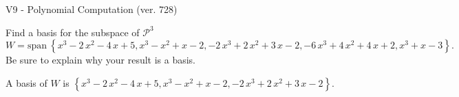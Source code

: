 \begin{exercise}
  \begin{exerciseTitle}V9 - Polynomial Computation (ver. 728)\end{exerciseTitle}
  \begin{exerciseStatement}
    Find a basis for the subspace of \(\mathcal{P}^3\) 
\[W=\mathrm{span}\ \left\{x^{3} - 2 \, x^{2} - 4 \, x + 5 , x^{3} - x^{2} + x - 2 , -2 \, x^{3} + 2 \, x^{2} + 3 \, x - 2 , -6 \, x^{3} + 4 \, x^{2} + 4 \, x + 2 , x^{3} + x - 3\right\}.\]
 Be sure to explain why your result is a basis.


  \end{exerciseStatement}
  \begin{exerciseAnswer}
   A basis of \(W\) is  \(\left\{x^{3} - 2 \, x^{2} - 4 \, x + 5 , x^{3} - x^{2} + x - 2 , -2 \, x^{3} + 2 \, x^{2} + 3 \, x - 2\right\}\).
  


  \end{exerciseAnswer}
\end{exercise}